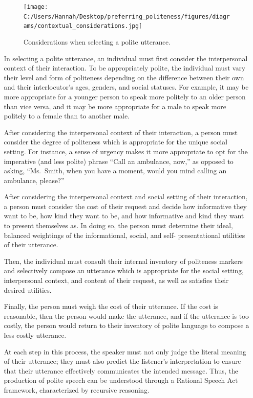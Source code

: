 \documentclass[
  english,
  man,floatsintext]{apa6}
\begin{document}
\begin{figure}
\centering
\texttt{[image: C:/Users/Hannah/Desktop/preferring\_politeness/figures/diagrams/contextual\_considerations.jpg]}
\caption{Considerations when selecting a polite utterance.}
\end{figure}

In selecting a polite utterance, an individual must first consider the interpersonal context of their interaction. To be appropriately polite, the individual must vary their level and form of politeness depending on the difference between their own and their interlocutor's ages, genders, and social statuses. For example, it may be more appropriate for a younger person to speak more politely to an older person than vice versa, and it may be more appropriate for a male to speak more politely to a female than to another male.

After considering the interpersonal context of their interaction, a person must consider the degree of politeness which is appropriate for the unique social setting. For instance, a sense of urgency makes it more appropriate to opt for the imperative (and less polite) phrase ``Call an ambulance, now,'' as opposed to asking, ``Ms.~Smith, when you have a moment, would you mind calling an ambulance, please?''

After considering the interpersonal context and social setting of their interaction, a person must consider the cost of their request and decide how informative they want to be, how kind they want to be, and how informative and kind they want to present themselves as. In doing so, the person must determine their ideal, balanced weightings of the informational, social, and self- presentational utilities of their utterance.

Then, the individual must consult their internal inventory of politeness markers and selectively compose an utterance which is appropriate for the social setting, interpersonal context, and content of their request, as well as satisfies their desired utilities.

Finally, the person must weigh the cost of their utterance. If the cost is reasonable, then the person would make the utterance, and if the utterance is too costly, the person would return to their inventory of polite language to compose a less costly utterance.

At each step in this process, the speaker must not only judge the literal meaning of their utterance; they must also predict the listener's interpretation to ensure that their utterance effectively communicates the intended message. Thus, the production of polite speech can be understood through a Rational Speech Act framework, characterized by recursive reasoning.
\end{document}
